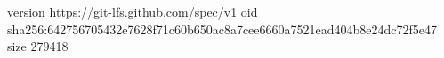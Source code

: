 version https://git-lfs.github.com/spec/v1
oid sha256:642756705432e7628f71c60b650ac8a7cee6660a7521ead404b8e24dc72f5e47
size 279418
